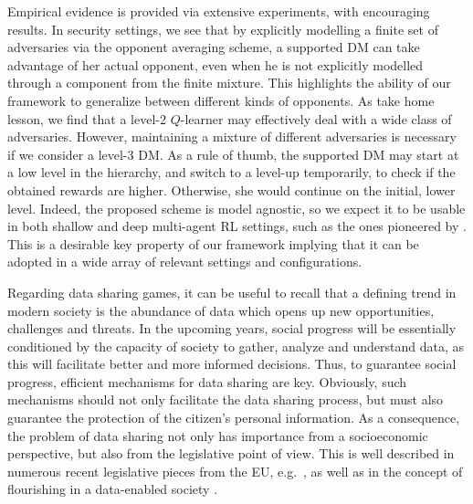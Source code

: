 Empirical evidence is provided via extensive experiments, with encouraging results. In security settings, we see that by explicitly modelling a finite set of adversaries via the opponent averaging scheme, a supported DM can take advantage of her actual opponent, even when he is not explicitly modelled through a component from the finite mixture. This highlights the ability of our framework to generalize between different kinds of opponents. As take home lesson, we find that a level-2 $Q$-learner may effectively deal with a wide class of adversaries. However, maintaining a mixture of different adversaries is necessary if we consider a level-3 DM. As a rule of thumb, the supported DM may start at a low level in the hierarchy, and switch to a level-up temporarily, to check if the obtained rewards are higher. Otherwise, she would  continue on the initial, lower level.  %
Indeed, the proposed scheme is
model agnostic, so we expect it to be usable in both shallow and deep multi-agent RL settings, such as the ones pioneered by \parencite{mnih2015human}. This is a desirable key property of our framework implying that it can be adopted in a wide array of relevant settings and configurations.











Regarding  data sharing games, it can be useful to recall that a defining trend in modern society is the abundance 
of data which opens up new opportunities, challenges
and threats. In the upcoming years, social progress will be essentially conditioned by the capacity of society to gather, analyze and understand data, as this will 
facilitate better and more informed decisions. 
Thus, to guarantee social progress,  efficient mechanisms
for data sharing are key. Obviously, such mechanisms
should not only facilitate the data sharing process, 
but must also guarantee the protection of the citizen's personal
information. As a consequence, the problem of data sharing not only
has importance from a socioeconomic perspective, but also from the
legislative point of view. This is well described in numerous recent legislative pieces from the 
EU, e.g.\ \parencite{europe1}, as well as in the concept of flourishing 
in a data-enabled society \parencite{allea}. 

